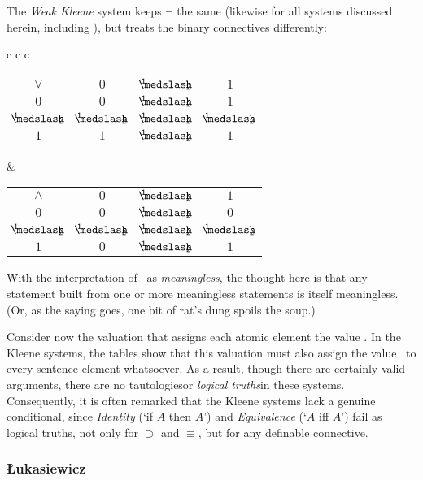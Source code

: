 	The \emph{Weak Kleene} system keeps $\neg$ the same (likewise for all systems discussed herein, including \GO), but treats the binary connectives differently:
\begin{singlespace}	
	\begin{longtable}{c c c}
		\begin{tabular}{c | c c c}
			$\vee$ & $0$ & $\oneHalf$ & $1$ \\
			\cline{1-4} 
			$0$ & $0$ & $\oneHalf$ & $1$ \\
			$\oneHalf$ & $\oneHalf$ & $\oneHalf$ & $\oneHalf$ \\
			$1$ & $1$ & $\oneHalf$ & $1$ \\
		\end{tabular}
		& 
		\begin{tabular}{c | c c c}
			$\wedge$ & $0$ & $\oneHalf$ & $1$ \\
			\cline{1-4} 
			$0$ & $0$ & $\oneHalf$ & $0$ \\
			$\oneHalf$ & $\oneHalf$ & $\oneHalf$ & $\oneHalf$ \\
			$1$ & $0$ & $\oneHalf$ & $1$ \\
		\end{tabular}
		
	\end{longtable}
\end{singlespace}	
	\noindent With the interpretation of \oneHalf\ as \emph{meaningless}, the thought here is that any statement built from one or more meaningless statements is itself meaningless. (Or, as the saying goes, one bit of rat's dung spoils the soup.)
	
	Consider now the valuation that assigns each atomic element the value \oneHalf. In the Kleene systems, the tables show that this valuation must also assign the value \oneHalf\ to every sentence element whatsoever. As a result, though there are certainly valid arguments, there are no tautologies\textemdash or \emph{logical truths}\textemdash in these systems. Consequently, it is often remarked that the Kleene systems lack a genuine conditional, since \emph{Identity} (`if $A$ then $A$') and \emph{Equivalence} (`$A$ iff $A$') fail as logical truths, not only for $\supset$ and $\equiv$, but for any definable connective.
	\subsubsection{\L ukasiewicz}\label{luk}
		
